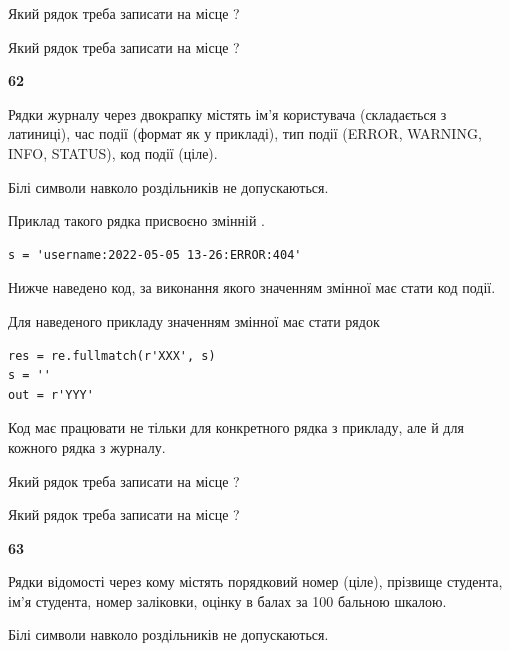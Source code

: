 Який рядок треба записати на місце  ?\par
\vspace{5mm}


Який рядок треба записати на місце  ?\par


\newpage

{\begin {center}\textbf{ 62}\end {center}}\par
Рядки журналу через двокрапку містять ім'я користувача (складається з латиниці), час події (фор\-мат як у прикладі), тип події (ERROR, WARNING, INFO, STATUS), код події (ціле).

Білі символи навколо роздільників не допускаються.

Приклад такого рядка присвоєно змінній .



\begin{verbatim}
s = 'username:2022-05-05 13-26:ERROR:404'
\end{verbatim}


Нижче наведено код, за виконання якого значенням змінної  має стати код події.

Для наведеного прикладу значенням змінної  має стати рядок 



\begin{verbatim}
res = re.fullmatch(r'XXX', s)
s = ''
out = r'YYY'
\end{verbatim}


Код має працювати не тільки для конкретного рядка з прикладу, але й для кожного рядка з журналу.




Який рядок треба записати на місце  ?\par
\vspace{5mm}


Який рядок треба записати на місце  ?\par


\newpage

{\begin {center}\textbf{ 63}\end {center}}\par
Рядки відомості через кому містять порядковий номер (ціле), пріз\-ви\-ще студен\-та, ім'я студента, номер заліковки, оцінку в балах за 100 бальною шкалою.

Білі символи навколо роздільників не допускаються.

